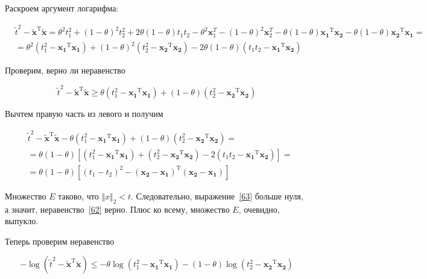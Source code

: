 	Раскроем аргумент логарифма:
	
	\begin{equation}
	\begin{split}
	&\tilde{t}^2 - \mathbf{\tilde{x}}^\text{T} \mathbf{\tilde{x}} = \theta^2 t_1^2
	+ (1-\theta)^2 t_2^2 + 2\theta(1-\theta)t_1 t_2 - \theta^2 \mathbf{x}_1^{T} -(1-
	\theta)^2 \mathbf{x}_2^{T} - \theta (1- \theta)\mathbf{x_1}^\text{T}
	\mathbf{x_2} - \theta (1- \theta)\mathbf{x_2}^\text{T} \mathbf{x_1} = \\
	&=\theta^2(t_1^2 - \mathbf{x_1}^\text{T} \mathbf{x_1}) + (1-\theta)^2(t_2^2 -
	\mathbf{x_2}^\text{T} \mathbf{x_2}) - 2\theta (1-\theta)(t_1 t_2 -
	\mathbf{x_1}^\text{T} \mathbf{x_2})
	\end{split}
	\end{equation}
	
	Проверим, верно ли неравенство
	
	\begin{equation}
	\label{62}
	\tilde{t}^2 - \mathbf{\tilde{x}}^\text{T} \mathbf{\tilde{x}} \geqslant \theta
	(t_1^2 - \mathbf{x_1}^\text{T} \mathbf{x_1}) + (1-\theta)(t_2^2 -
	\mathbf{x_2}^\text{T} \mathbf{x_2})
	\end{equation}
	
	Вычтем правую часть из левого и получим
	
	
	
	\begin{equation}
	\begin{split}
	\label{63}
	&\tilde{t}^2 - \mathbf{\tilde{x}}^\text{T} \mathbf{\tilde{x}} - \theta (t_1^2 -
	\mathbf{x_1}^\text{T} \mathbf{x_1}) + (1-\theta)(t_2^2 - \mathbf{x_2}^\text{T}
	\mathbf{x_2}) = \\
	&= \theta(1-\theta) \left[ (t_1^2 - \mathbf{x_1}^\text{T} \mathbf{x_1}) +
	(t_2^2 - \mathbf{x_2}^\text{T} \mathbf{x_2}) - 2(t_1 t_2 - \mathbf{x_1}^\text{T}
	\mathbf{x_2})\right] = \\
	&=\theta(1-\theta) \left[ (t_1-t_2)^2 - (\mathbf{x_2} -
	\mathbf{x_1})^\text{T}(\mathbf{x_2} - \mathbf{x_1})\right] 
	\end{split}
	\end{equation}
	
	Множество $E$ таково, что $\Vert x \Vert_2 < t$. Следовательно,
	выражение~\eqref{63} больше нуля, а значит, неравенство~\eqref{62} верно. Плюс ко всему, множество $E$, очевидно, выпукло.
	
	Теперь проверим неравенство
	
	\begin{equation}
	\label{64}
	-\log(\tilde{t}^2 - \mathbf{\tilde{x}}^\text{T} \mathbf{\tilde{x}}) \leqslant -
	\theta \log(t_1^2 - \mathbf{x_1}^\text{T} \mathbf{x_1}) - (1-\theta) \log(t_2^2
	- \mathbf{x_2}^\text{T} \mathbf{x_2})
	\end{equation}
	
